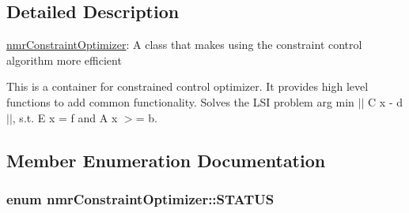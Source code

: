 \subsection{Detailed Description}
\hyperlink{classnmr_constraint_optimizer}{nmr\-Constraint\-Optimizer}\-: A class that makes using the constraint control algorithm more efficient 

This is a container for constrained control optimizer. It provides high level functions to add common functionality. Solves the L\-S\-I problem arg min $\vert$$\vert$ C x -\/ d $\vert$$\vert$, s.\-t. E x = f and A x $>$= b. 

\subsection{Member Enumeration Documentation}
\hypertarget{classnmr_constraint_optimizer_ad46bf972892431d2c0a43a7099aec898}{
\subsubsection[{S\-T\-A\-T\-U\-S}]{\setlength{\rightskip}{0pt plus 5cm}enum {\bf nmr\-Constraint\-Optimizer\-::\-S\-T\-A\-T\-U\-S}}}\label{classnmr_constraint_optimizer_ad46bf972892431d2c0a43a7099aec898}
